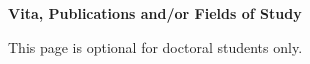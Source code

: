 \centerline{\bf{Vita, Publications and/or Fields of Study}}
\vspace*{4\baselineskip}
This page is optional for doctoral students only.

\newpage
